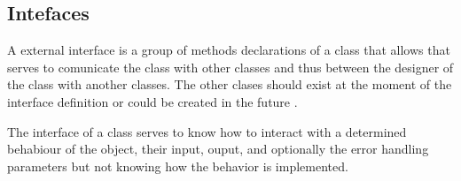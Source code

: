 \subsection{Intefaces}

A external interface is a group of 
methods declarations of a class 
that allows that serves to comunicate the class
with other classes and thus between the 
designer of the class with 
another classes. The other clases should 
exist at the moment of the interface definition 
or could be created in the future 
\cite[pp.~90-105]{Adobe:AS3man2008} 
\cite{Snyder:1986}. 

The interface of a class serves 
to know how to interact with a determined
behabiour of the object, their input, ouput, 
and optionally the error handling parameters
but not knowing how the behavior is implemented.

